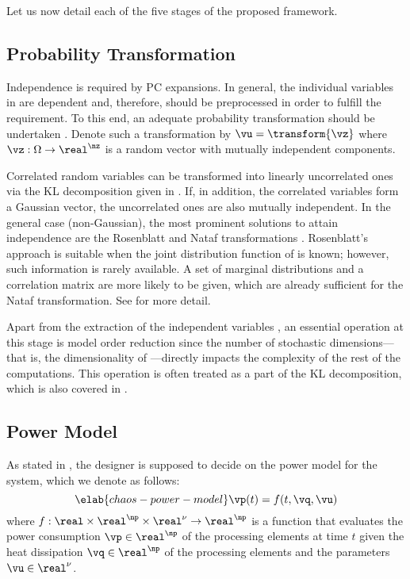 Let us now detail each of the five stages of the proposed framework.

\subsection{Probability Transformation}

Independence is required by \ac{PC} expansions. In general, the \nu individual
variables in \vu are dependent and, therefore, should be preprocessed in order
to fulfill the requirement. To this end, an adequate probability transformation
should be undertaken \cite{eldred2008}. Denote such a transformation by $\vu =
\transform{\vz}$ where $\vz: \Omega \to \real^\nz$ is a random vector with \nz
mutually independent components.

Correlated random variables can be transformed into linearly uncorrelated ones
via the \ac{KL} decomposition given in . If, in addition,
the correlated variables form a Gaussian vector, the uncorrelated ones are also
mutually independent. In the general case (non-Gaussian), the most prominent
solutions to attain independence are the Rosenblatt \cite{rosenblatt1952} and
Nataf transformations \cite{liu1986}. Rosenblatt's approach is suitable when the
joint distribution function of \vu is known; however, such information is rarely
available. A set of marginal distributions and a correlation matrix are more
likely to be given, which are already sufficient for the Nataf transformation.
See  for more detail.

Apart from the extraction of the independent variables \vz, an essential
operation at this stage is model order reduction since the number of stochastic
dimensions---that is, the dimensionality of \vz---directly impacts the
complexity of the rest of the computations. This operation is often treated as a
part of the \ac{KL} decomposition, which is also covered in
.

\subsection{Power Model}

As stated in , the designer is supposed to decide on the
power model for the system, which we denote as follows:
\begin{equation} \elab{chaos-power-model}
  \vp(t) = f(t, \vq, \vu)
\end{equation}
where $f: \real \times \real^\np \times \real^\nu \to \real^\np$ is a function
that evaluates the power consumption $\vp \in \real^\np$ of the processing
elements at time $t$ given the heat dissipation $\vq \in \real^\np$ of the
processing elements and the parameters $\vu \in \real^\nu$.

